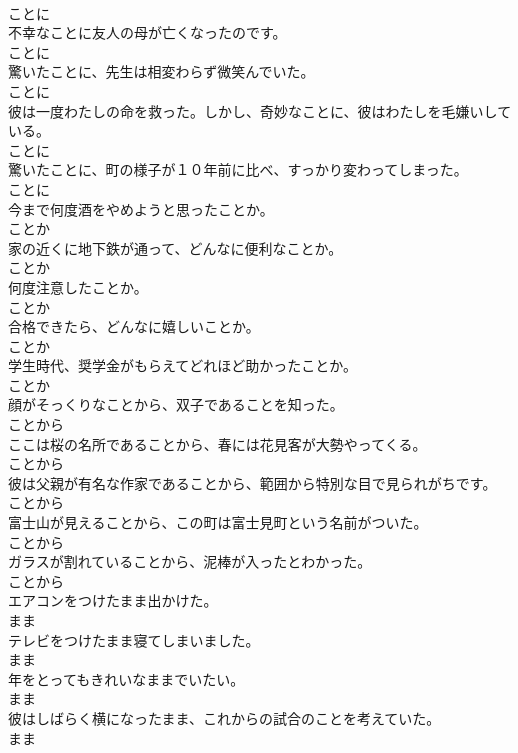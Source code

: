 \documentclass[8pt]{extreport}
\begin{document}
\begin{CJK}{UTF8}{min}
\\	ことに
\\	不幸なことに友人の母が亡くなったのです。	
\\	ことに
\\	驚いたことに、先生は相変わらず微笑んでいた。	
\\	ことに
\\	彼は一度わたしの命を救った。しかし、奇妙なことに、彼はわたしを毛嫌いしている。	
\\	ことに
\\	驚いたことに、町の様子が１０年前に比べ、すっかり変わってしまった。	
\\	ことに
\\	今まで何度酒をやめようと思ったことか。	
\\	ことか
\\	家の近くに地下鉄が通って、どんなに便利なことか。	
\\	ことか
\\	何度注意したことか。	
\\	ことか
\\	合格できたら、どんなに嬉しいことか。	
\\	ことか
\\	学生時代、奨学金がもらえてどれほど助かったことか。	
\\	ことか
\\	顔がそっくりなことから、双子であることを知った。	
\\	ことから
\\	ここは桜の名所であることから、春には花見客が大勢やってくる。	
\\	ことから
\\	彼は父親が有名な作家であることから、範囲から特別な目で見られがちです。	
\\	ことから
\\	富士山が見えることから、この町は富士見町という名前がついた。	
\\	ことから
\\	ガラスが割れていることから、泥棒が入ったとわかった。	
\\	ことから
\\	エアコンをつけたまま出かけた。	
\\	まま
\\	テレビをつけたまま寝てしまいました。	
\\	まま
\\	年をとってもきれいなままでいたい。	
\\	まま
\\	彼はしばらく横になったまま、これからの試合のことを考えていた。	
\\	まま

\end{CJK}
\end{document}
